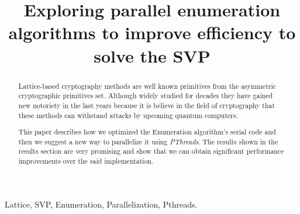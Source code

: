 \documentclass[conference]{IEEEtran}
\begin{document}
%
\title{Exploring parallel enumeration algorithms to improve efficiency to solve the SVP}


\author{
\and
{}
\and
{}
}

\maketitle

\begin{abstract}
    Lattice-based cryptography methods are well known primitives from the  asymmetric cryptographic primitives set. Although widely studied for decades they have gained new notoriety in the last years because it is believe in the field of cryptography that these methods can withstand attacks by upcoming quantum computers.
    
    This paper describes how we optimized the Enumeration algorithm's serial code and then we suggest a new way to parallelize it using \emph{PThreads}. The results shown in the results section are very promising and show that we can obtain significant performance improvements over the said implementation.
    
\end{abstract}


\begin{IEEEkeywords}
Lattice, SVP, Enumeration, Parallelization, Pthreads.
\end{IEEEkeywords}
\end{document}
